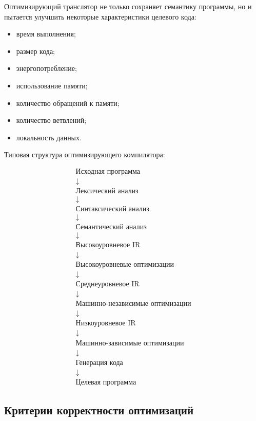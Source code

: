 \documentclass[12pt,a4paper]{article}
\begin{document}
Оптимизирующий транслятор не только сохраняет семантику программы, но и пытается улучшить некоторые характеристики целевого кода:
\begin{itemize}
    \item время выполнения;
    \item размер кода;
    \item энергопотребление;
    \item использование памяти;
    \item количество обращений к памяти;
    \item количество ветвлений;
    \item локальность данных.
\end{itemize}

Типовая структура оптимизирующего компилятора:

\[
\begin{array}{c}
\text{Исходная программа}
\\[4pt]
\downarrow
\\[4pt]
\text{Лексический анализ}
\\[4pt]
\downarrow
\\[4pt]
\text{Синтаксический анализ}
\\[4pt]
\downarrow
\\[4pt]
\text{Семантический анализ}
\\[4pt]
\downarrow
\\[4pt]
\text{Высокоуровневое IR}
\\[4pt]
\downarrow
\\[4pt]
\text{Высокоуровневые оптимизации}
\\[4pt]
\downarrow
\\[4pt]
\text{Среднеуровневое IR}
\\[4pt]
\downarrow
\\[4pt]
\text{Машинно-независимые оптимизации}
\\[4pt]
\downarrow
\\[4pt]
\text{Низкоуровневое IR}
\\[4pt]
\downarrow
\\[4pt]
\text{Машинно-зависимые оптимизации}
\\[4pt]
\downarrow
\\[4pt]
\text{Генерация кода}
\\[4pt]
\downarrow
\\[4pt]
\text{Целевая программа}
\end{array}
\]

\subsection{Критерии корректности оптимизаций}
\end{document}
